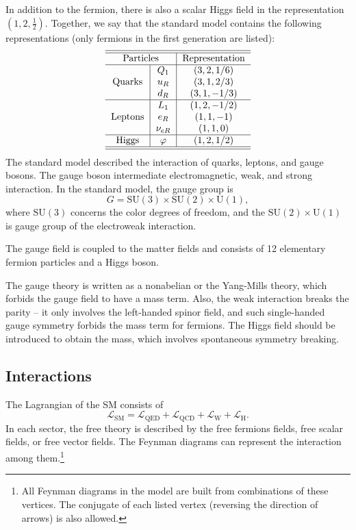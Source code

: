\documentclass[aps,rmp,twocolumn,superscriptaddress,nofootinbib]{revtex4-2}
\begin{document}
In addition to the fermion, there is also a scalar Higgs field in the representation $(1,2,\frac{1}{2})$.
Together, we say that the standard model contains the following representations (only fermions in the first generation are listed):
\begin{equation*}
\begin{tabular}{c|c|c}
\hline \hline
\multicolumn{2}{c|}{Particles} & Representation\tabularnewline
\hline 
\multirow{3}{*}{Quarks} & $Q_{1}$ & $(3,2,1/6)$\tabularnewline
 & $u_{R}$ & $(3,1,2/3)$\tabularnewline
 & $d_{R}$ & $(3,1,-1/3)$\tabularnewline
\hline 
\multirow{3}{*}{Leptons} & $L_{1}$ & $(1,2,-1/2)$\tabularnewline
 & $e_{R}$ & $(1,1,-1)$\tabularnewline
 & $\nu_{eR}$ & $(1,1,0)$\tabularnewline
\hline 
Higgs & $\varphi$ & $(1,2,1/2)$\tabularnewline
\hline \hline
\end{tabular}
\end{equation*}
The standard model described the interaction of quarks, leptons, and gauge bosons.
The gauge boson intermediate electromagnetic, weak, and strong interaction.
In the standard model, the gauge group is 
\begin{equation}
	G = \mathrm{SU(3)}\times \mathrm{SU(2)} \times \mathrm{U(1)},
\end{equation}
where $\mathrm{SU(3)}$ concerns the color degrees of freedom, and the $\mathrm{SU(2)}\times \mathrm{U(1)}$ is gauge group of the electroweak interaction.

The gauge field is coupled to the matter fields and consists of 12 elementary fermion particles and a Higgs boson.

The gauge theory is written as a nonabelian or the Yang-Mills theory, which forbids the gauge field to have a mass term.
Also, the weak interaction breaks the parity -- it only involves the left-handed spinor field, and such single-handed gauge symmetry forbids the mass term for fermions.
The Higgs field should be introduced to obtain the mass, which involves spontaneous symmetry breaking.


\subsection{Interactions}
The Lagrangian of the SM consists of
\begin{equation}
	\mathcal L_{\mathrm{SM}} = \mathcal L_{\mathrm{QED}} + \mathcal L_{\mathrm{QCD}} + \mathcal L_{\mathrm{W}} + \mathcal L_{\mathrm{H}}.
\end{equation}
In each sector, the free theory is described by the free fermions fields, free scalar fields, or free vector fields.
The Feynman diagrams can represent the interaction among them.\footnote{All Feynman diagrams in the model are built from combinations of these vertices. The conjugate of each listed vertex (reversing the direction of arrows) is also allowed.}
\end{document}
